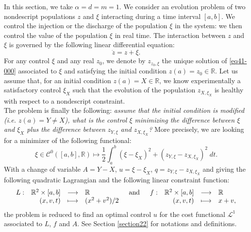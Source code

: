 \documentclass[english,11pt,reqno]{smfart}
\def\di{\displaystyle}
\newcommand{\R}{\mathbb{R}}
\newcommand{\LL}{\mathcal{L}}
\newcommand{\CC}{\mathscr{C}}
\newcommand{\fonction}[5]{\begin{array}[t]{lrcl}#1 :&#2 &\longrightarrow &#3\\&#4& \longmapsto &#5 \end{array}}
\begin{document}
In this section, we take $\alpha = d = m = 1$. We consider an evolution problem of two nondescript populations $z$ and $\xi$ interacting during a time interval $[a,b]$. We control the injection or the discharge of the population $\xi$ in the system: we then control the value of the population $\xi$ in real time. The interaction between $z$ and $\xi$ is governed by the following linear differential equation:
\begin{equation}\label{eq41-000}
\dot{z} = z + \xi .
\end{equation}
For any control $\xi$ and any real $z_0$, we denote by $z_{z_0,\xi}$ the unique solution of \eqref{eq41-000} associated to $\xi$ and satisfying the initial condition $z(a)=z_0 \in \R$. Let us assume that, for an initial condition $z(a)=X \in \R$, we know experimentally a satisfactory control $\xi_X$ such that the evolution of the population $z_{X,\xi_X}$ is healthy with respect to a nondescript constraint. \\

The problem is finally the following: \textit{assume that the initial condition is modified (\textit{i.e.} $z(a)=Y \neq X$), what is the control $\xi$ minimizing the difference between $\xi$ and $\xi_X$ plus the difference between $z_{Y,\xi}$ and $z_{X,\xi_X}$?} More precisely, we are looking for a minimizer of the following functional:
\begin{equation}\label{eq41-0}
\xi \in \CC^0([a,b],\R) \longmapsto \dfrac{1}{2} \di \int_a^b (\xi - \xi_X)^2 + (z_{Y,\xi} -z_{X,\xi_X})^2 \; dt.
\end{equation}
With a change of variable $A=Y-X$, $u=\xi - \xi_X$, $q=z_{Y,\xi} -z_{X,\xi_X}$ and giving the following quadratic Lagrangian and the following linear constraint function:
\begin{equation}\label{eq41-00}
\fonction{L}{\R^2 \times [a,b]}{\R}{(x,v,t)}{(x^2+v^2)/2} \quad \text{and} \quad \fonction{f}{\R^2 \times [a,b]}{\R}{(x,v,t)}{x+v,}
\end{equation}
the problem is reduced to find an optimal control $u$ for the cost functional $\LL^1$ associated to $L$, $f$ and $A$. See Section \ref{section22} for notations and definitions. \\
\end{document}
